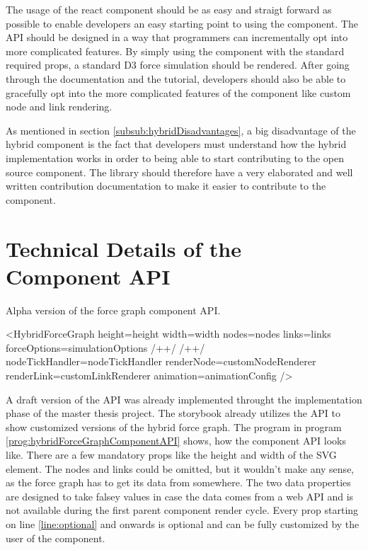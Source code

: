 The usage of the react component should be as easy and straigt forward as possible to enable developers an easy starting point to using the component. The API should be designed in a way that programmers can incrementally opt into more complicated features. By simply using the component with the standard required props, a standard D3 force simulation should be rendered. After going through the documentation and the tutorial, developers should also be able to gracefully opt into the more complicated features of the component like custom node and link rendering.

As mentioned in section \ref{subsub:hybridDisadvantages}, a big disadvantage of the hybrid component is the fact that developers must understand how the hybrid implementation works in order to being able to start contributing to the open source component. The library should therefore have a very elaborated and well written contribution documentation to make it easier to contribute to the component.

\section{Technical Details of the Component API}

\begin{program}
\caption{Alpha version of the force graph component API.}
\label{prog:hybridForceGraphComponentAPI}
\begin{JsCode}
<HybridForceGraph 
  height={height}
  width={width}
  nodes={nodes}
  links={links}
  forceOptions={simulationOptions} /+\label{line:foceOptions}+/ /+\label{line:optional}+/ 
  nodeTickHandler={nodeTickHandler}
  renderNode={customNodeRenderer}
  renderLink={customLinkRenderer}
  animation={animationConfig}
/>
\end{JsCode}
\end{program}

A draft version of the API was already implemented throught the implementation phase of the master thesis project. The storybook already utilizes the API to show customized versions of the hybrid force graph. The program in program \ref{prog:hybridForceGraphComponentAPI} shows, how the component API looks like. There are a few mandatory props like the height and width of the SVG element. The nodes and links could be omitted, but it wouldn't make any sense, as the force graph has to get its data from somewhere. The two data properties are designed to take falsey values in case the data comes from a web API and is not available during the first parent component render cycle. Every prop starting on line \ref{line:optional} and onwards is optional and can be fully customized by the user of the component.

